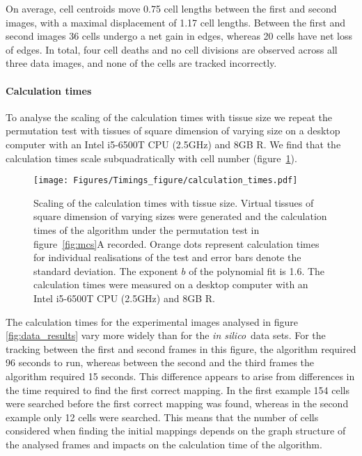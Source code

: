 \documentclass[a4paper,11pt]{article}
\newcommand{\insilico}{\textit{in silico}~}
\begin{document}

On average, cell centroids move 0.75 cell lengths between the first and second images, with a maximal displacement of 1.17 cell lengths. 
Between the first and second images 36 cells undergo a net gain in edges, whereas 20 cells have net loss of edges. 
In total, four cell deaths and no cell divisions are observed across all three data images, and none of the cells are tracked incorrectly. 


\paragraph{Calculation times}

To analyse the scaling of the calculation times with tissue size we repeat the permutation test with tissues of square dimension of varying size on a desktop computer with an Intel i5-6500T CPU (2.5GHz) and 8GB R. We find that the calculation times scale subquadratically with cell number (figure~\ref{fig:calculation_times}). 

\clearpage
\begin{figure}[h]
\centering
\texttt{[image: Figures/Timings\_figure/calculation\_times.pdf]}
\caption{Scaling of the calculation times with tissue size. 
Virtual tissues of square dimension of varying sizes were generated and the calculation times of the algorithm under the permutation test in figure~\ref{fig:mcs}A recorded. 
Orange dots represent calculation times for individual realisations of the test and error bars denote the standard deviation. 
The exponent $b$ of the polynomial fit is 1.6. 
The calculation times were measured on a desktop computer with an Intel i5-6500T CPU (2.5GHz) and 8GB R.}
\label{fig:calculation_times}
\end{figure}



The calculation times for the experimental images analysed in figure \ref{fig:data_results} vary more widely than for the \insilico data sets. 
For the tracking between the first and second frames in this figure, the algorithm required 96 seconds to run, whereas between the second and the third frames the algorithm required 15 seconds. 
This difference appears to arise from differences in the time required to find the first correct mapping. 
In the first example 154 cells were searched before the first correct mapping was found, whereas in the second example only 12 cells were searched. This means that the number of cells considered when finding the initial mappings depends on the graph structure of the analysed frames and impacts on the calculation time of the algorithm. 
\end{document}

